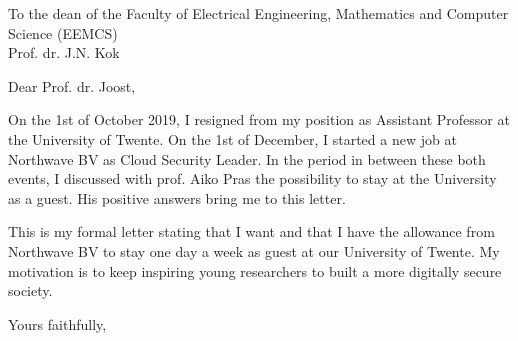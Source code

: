 \documentclass[10pt]{brownletter_utwente}
\date{\today}
\begin{document}
\begin{letter}{
To the dean of the Faculty of Electrical Engineering, Mathematics and Computer Science (EEMCS)\\
Prof. dr. J.N. Kok 
}

\opening{Dear Prof. dr. Joost,}

On the 1st of October 2019, I resigned from my position as Assistant Professor at the University of Twente. On the 1st of December, I started a new job at Northwave BV as Cloud Security Leader. In the period in between these both events, I discussed with prof. Aiko Pras the possibility to stay at the University as a guest. His positive answers bring me to this letter.

This is my formal letter stating that I want and that I have the allowance from Northwave BV to stay one day a week as guest at our University of Twente. My motivation is to keep inspiring young researchers to built a more digitally secure society. 


\closing{Yours faithfully,}

\end{letter}
\end{document}
